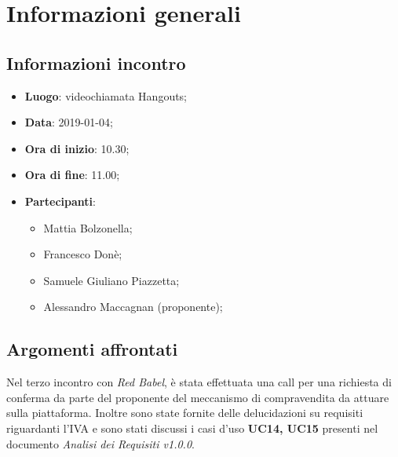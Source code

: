 \section{Informazioni generali}

\subsection{Informazioni incontro}
\begin{itemize}
\item \textbf{Luogo}: videochiamata Hangouts;
\item \textbf{Data}: 2019-01-04;
\item \textbf{Ora di inizio}: 10.30;
\item \textbf{Ora di fine}: 11.00;
\item \textbf{Partecipanti}:
\begin{itemize}
	\item Mattia Bolzonella;
	\item Francesco Donè;
	\item Samuele Giuliano Piazzetta;
	\item Alessandro Maccagnan (proponente);
\end{itemize}
\end{itemize}

\subsection{Argomenti affrontati}
Nel terzo incontro con \textit{Red Babel}, è stata effettuata una call per una 
richiesta di conferma da parte del proponente del meccanismo di compravendita 
da attuare sulla piattaforma. Inoltre sono state fornite delle delucidazioni su requisiti 
riguardanti l’IVA e sono stati discussi i casi d’uso \textbf{UC14, UC15} presenti
nel documento \textit{Analisi dei Requisiti v1.0.0}.

